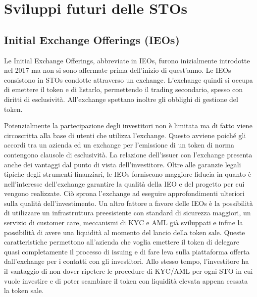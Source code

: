 \chapter{Sviluppi futuri delle STOs}
\section{Initial Exchange Offerings (IEOs)}
Le Initial Exchange Offerings, abbreviate in IEOs, furono inizialmente introdotte nel 2017 ma non si sono affermate prima dell'inizio di quest'anno. Le IEOs consistono in STOs condotte attraverso un exchange. L'exchange quindi si occupa di emettere il token e di listarlo, permettendo il trading secondario, spesso con diritti di esclusività. All'exchange spettano inoltre gli obblighi di gestione del token. 

Potenzialmente la partecipazione degli investitori non è limitata ma di fatto viene circoscritta alla base di utenti che utilizza l'exchange. Questo avviene poiché gli accordi tra un azienda ed un exchange per l'emissione di un token di norma contengono clausole di esclusività. 
La relazione dell'issuer con l'exchange presenta anche dei vantaggi dal punto di vista dell'investitore. Oltre alle garanzie legali tipiche degli strumenti finanziari, le IEOs forniscono maggiore fiducia in quanto è nell'interesse dell'exchange garantire la qualità della IEO e del progetto per cui vengono realizzate. Ciò sprona l'exchange ad eseguire approfondimenti ulteriori sulla qualità dell'investimento. Un altro fattore a favore delle IEOs è la possibilità di utilizzare un infrastruttura preesistente con standard di sicurezza maggiori, un servizio di customer care, meccanismi di KYC e AML già sviluppati e infine la possibilità di avere una liquidità al momento del lancio della token sale. 
Queste caratteristiche permettono all'azienda che voglia emettere il token di delegare quasi completamente il processo di issuing e di fare leva sulla piattaforma offerta dall'exchange per i contatti con gli investitori. Allo stesso tempo, l'investitore ha il vantaggio di non dover ripetere le procedure di KYC/AML per ogni STO in cui vuole investire e di poter scambiare il token con liquidità elevata appena cessata la token sale.


